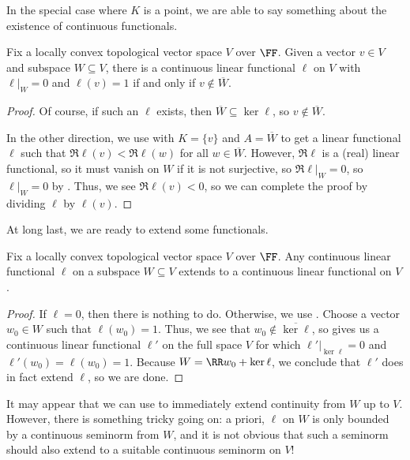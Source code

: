 \documentclass[notes.tex]{subfiles}
\begin{document}
In the special case where $K$ is a point, we are able to say something about the existence of continuous functionals.
\begin{corollary} \label{cor:subspace-closure-by-func}
	Fix a locally convex topological vector space $V$ over $\FF$. Given a vector $v\in V$ and subspace $W\subseteq V$, there is a continuous linear functional $\ell$ on $V$ with $\ell|_W=0$ and $\ell(v)=1$ if and only if $v\notin\overline W$.
\end{corollary}
\begin{proof}
	Of course, if such an $\ell$ exists, then $\overline W\subseteq\ker\ell$, so $v\notin\overline W$.

	In the other direction, we use  with $K=\{v\}$ and $A=\overline W$ to get a linear functional $\ell$ such that $\Re\ell(v)<\Re\ell(w)$ for all $w\in\overline W$. However, $\Re\ell$ is a (real) linear functional, so it must vanish on $W$ if it is not surjective, so $\Re\ell|_W=0$, so $\ell|_W=0$ by . Thus, we see $\Re\ell(v)<0$, so we can complete the proof by dividing $\ell$ by $\ell(v)$.
\end{proof}
At long last, we are ready to extend some functionals.
\begin{corollary}
	Fix a locally convex topological vector space $V$ over $\FF$. Any continuous linear functional $\ell$ on a subspace $W\subseteq V$ extends to a continuous linear functional on $V$.
\end{corollary}
\begin{proof}
	If $\ell=0$, then there is nothing to do. Otherwise, we use . Choose a vector $w_0\in W$ such that $\ell(w_0)=1$. Thus, we see that $w_0\notin\overline{\ker\ell}$, so  gives us a continuous linear functional $\ell'$ on the full space $V$ for which $\ell'|_{\ker\ell}=0$ and $\ell'(w_0)=\ell(w_0)=1$. Because $W=\RR w_0+\ker\ell$, we conclude that $\ell'$ does in fact extend $\ell$, so we are done.
\end{proof}
\begin{remark}
	It may appear that we can use  to immediately extend continuity from $W$ up to $V$. However, there is something tricky going on: a priori, $\ell$ on $W$ is only bounded by a continuous seminorm from $W$, and it is not obvious that such a seminorm should also extend to a suitable continuous seminorm on $V$!
\end{remark}
\end{document}
